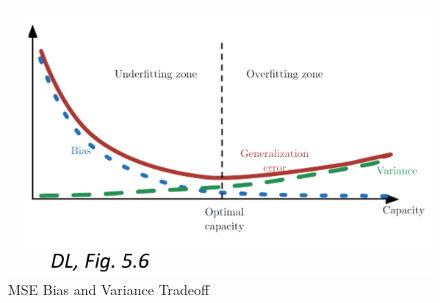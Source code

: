 \documentclass[../Main.tex]{subfiles}
\begin{document}
\begin{figure}[H]
    \centering
    \includegraphics[width=0.75\linewidth]{Images/mse-bias-variance-tradeoff.png}
    \caption{MSE Bias and Variance Tradeoff}
\end{figure}
\end{document}
